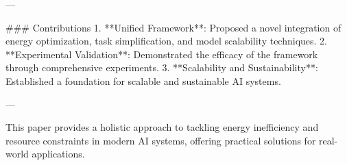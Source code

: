 ---

### Contributions  
1. **Unified Framework**: Proposed a novel integration of energy optimization, task simplification, and model scalability techniques.  
2. **Experimental Validation**: Demonstrated the efficacy of the framework through comprehensive experiments.  
3. **Scalability and Sustainability**: Established a foundation for scalable and sustainable AI systems.  

--- 

This paper provides a holistic approach to tackling energy inefficiency and resource constraints in modern AI systems, offering practical solutions for real-world applications.